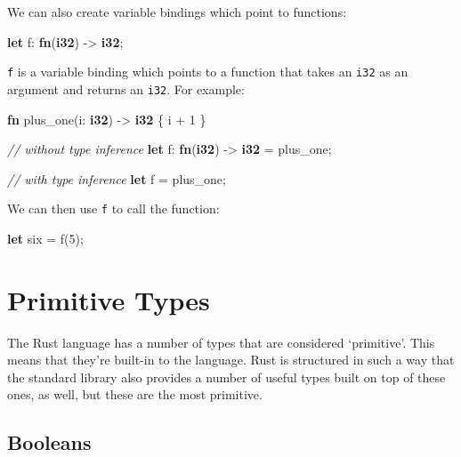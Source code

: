 \documentclass[a4paper,]{book}
\newenvironment{Shaded}{\begin{snugshade}}{\end{snugshade}}
\newcommand{\KeywordTok}[1]{\textcolor[rgb]{0.13,0.29,0.53}{\textbf{{#1}}}}
\newcommand{\DecValTok}[1]{\textcolor[rgb]{0.00,0.00,0.81}{{#1}}}
\newcommand{\CommentTok}[1]{\textcolor[rgb]{0.56,0.35,0.01}{\textit{{#1}}}}
\newcommand{\NormalTok}[1]{{#1}}
\begin{document}
We can also create variable bindings which point to functions:

\begin{Shaded}
\begin{Highlighting}[]
\KeywordTok{let} \NormalTok{f: }\KeywordTok{fn}\NormalTok{(}\KeywordTok{i32}\NormalTok{) -> }\KeywordTok{i32}\NormalTok{;}
\end{Highlighting}
\end{Shaded}

\texttt{f} is a variable binding which points to a function that takes
an \texttt{i32} as an argument and returns an \texttt{i32}. For example:

\begin{Shaded}
\begin{Highlighting}[]
\KeywordTok{fn} \NormalTok{plus_one(i: }\KeywordTok{i32}\NormalTok{) -> }\KeywordTok{i32} \NormalTok{\{}
    \NormalTok{i + }\DecValTok{1}
\NormalTok{\}}

\CommentTok{// without type inference}
\KeywordTok{let} \NormalTok{f: }\KeywordTok{fn}\NormalTok{(}\KeywordTok{i32}\NormalTok{) -> }\KeywordTok{i32} \NormalTok{= plus_one;}

\CommentTok{// with type inference}
\KeywordTok{let} \NormalTok{f = plus_one;}
\end{Highlighting}
\end{Shaded}

We can then use \texttt{f} to call the function:

\begin{Shaded}
\begin{Highlighting}[]
\KeywordTok{let} \NormalTok{six = f(}\DecValTok{5}\NormalTok{);}
\end{Highlighting}
\end{Shaded}

\section{Primitive Types}\label{sec--primitive-types}

The Rust language has a number of types that are considered `primitive'.
This means that they're built-in to the language. Rust is structured in
such a way that the standard library also provides a number of useful
types built on top of these ones, as well, but these are the most
primitive.

\subsection{Booleans}\label{booleans}
\end{document}
